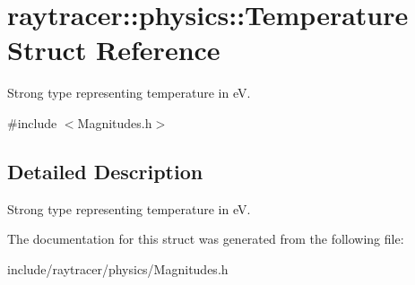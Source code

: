 \hypertarget{structraytracer_1_1physics_1_1Temperature}{}\section{raytracer\+:\+:physics\+:\+:Temperature Struct Reference}
\label{structraytracer_1_1physics_1_1Temperature}


Strong type representing temperature in eV.  




{\ttfamily \#include $<$Magnitudes.\+h$>$}



\subsection{Detailed Description}
Strong type representing temperature in eV. 



The documentation for this struct was generated from the following file\+:\begin{DoxyCompactItemize}
\item 
include/raytracer/physics/Magnitudes.\+h\end{DoxyCompactItemize}
